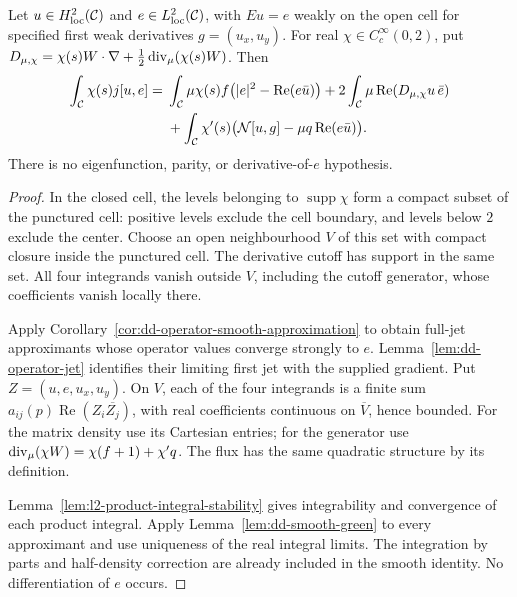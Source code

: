 \begin{lemma}
\label{lem:dd-weak-green}
\leanok
Let $u\in H^2_{\mathrm{loc}}(\mathcal{C})$ and $e\in L^2_{\mathrm{loc}}(\mathcal{C})$,
with $Eu=e$ weakly on the open cell for specified first weak derivatives
$g=(u_x,u_y)$. For real $\chi\in C_c^\infty(0,2)$, put
$D_{\mu,\chi}=\chi(s)W\cdot\nabla+\tfrac12\operatorname{div}_\mu(\chi(s)W)$. Then
\begin{align*}
 \int_{\mathcal{C}}\chi(s)j[u,e]
 ={}&\int_{\mathcal{C}}\mu\chi(s)f
       \bigl(|e|^2-\operatorname{Re}(e\bar u)\bigr)
       +2\int_{\mathcal{C}}\mu\operatorname{Re}(D_{\mu,\chi}u\,\bar e)\\
 &+\int_{\mathcal{C}}\chi'(s)
       \bigl(\mathcal N[u,g]-\mu q\operatorname{Re}(e\bar u)\bigr).
\end{align*}
There is no eigenfunction, parity, or derivative-of-$e$ hypothesis.
\end{lemma}

\begin{proof}
\leanok
In the closed cell, the levels belonging to $\operatorname{supp}\chi$ form
a compact subset of the punctured cell: positive levels exclude the cell boundary,
and levels below $2$ exclude the center. Choose an open neighbourhood $V$ of this
set with compact closure inside the punctured cell. The derivative cutoff has
support in the same set. All four integrands vanish outside $V$, including
the cutoff generator, whose coefficients vanish locally there.

Apply Corollary~\ref{cor:dd-operator-smooth-approximation} to obtain
full-jet approximants whose operator values converge strongly to $e$.
Lemma~\ref{lem:dd-operator-jet} identifies their limiting first jet with
the supplied gradient. Put $Z=(u,e,u_x,u_y)$.
On $V$, each of the four integrands is a finite sum
$a_{ij}(p)\operatorname{Re}(Z_i\overline{Z_j})$, with real coefficients
continuous on $\overline V$, hence bounded. For the matrix density use its
Cartesian entries; for the generator use
$\operatorname{div}_\mu(\chi W)=\chi(f+1)+\chi'q$.
The flux has the same quadratic structure by its definition.

Lemma~\ref{lem:l2-product-integral-stability} gives integrability and convergence
of each product integral. Apply Lemma~\ref{lem:dd-smooth-green} to every approximant
and use uniqueness of the real integral limits. The integration by parts
and half-density correction are already included in the smooth identity.
No differentiation of $e$ occurs.
\end{proof}

